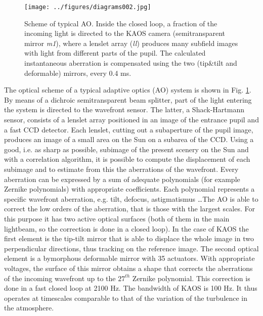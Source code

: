 \begin{figure}[t]
\begin{center}
\texttt{[image: ../figures/diagrams002.jpg]}
\caption{Scheme of typical AO. Inside the closed loop, a fraction of the incoming light is directed to the KAOS camera (semitransparent mirror \emph{m1}), where a lenslet array (\emph{ll}) produces many subfield images with light from different parts of the pupil. The calculated instantaneous aberration is compensated using the two (tip\&tilt  and deformable) mirrors, every 0.4 ms.}
\label{fig:kaos:optical}
\end{center}
\end{figure}

The optical scheme of a typical adaptive optics  (AO) system is shown in Fig. \ref{fig:kaos:optical}. By means of a dichroic semitransparent beam splitter, part of the light entering the system is directed to the wavefront sensor. The latter, a Shack-Hartmann sensor, consists of a lenslet array positioned in an image of the entrance pupil and  a fast CCD detector. Each lenslet, cutting out a subaperture of the pupil image, produces an image of a small area on the Sun on a subarea of the CCD. Using a good, i.e. as sharp as possible, subimage of the present scenery on the Sun and with a correlation algorithm, it is possible to compute the displacement of each subimage and to estimate from this the aberrations of the wavefront.
Every aberration can be expressed by a sum of adequate polynomials (for example Zernike polynomials) with appropriate coefficients. Each polynomial represents a specific wavefront aberration, e.g.  tilt, defocus, astigmatismus \dots The AO is able to correct the low orders of the aberration, that is those with the largest scales. For this purpose  it has two active optical surfaces (both of them in the main lightbeam, so the correction is done in a closed loop). In the case of KAOS the first element is the tip-tilt mirror that is able to displace the whole image in two perpendicular directions, thus tracking on the reference image. The second optical element is a bymorphous deformable mirror with 35 actuators. With appropriate voltages, the surface of this mirror obtains a shape that corrects the aberrations of the incoming wavefront up to the $27^{th}$ Zernike polynomial. This correction is done in a fast closed loop at 2100 Hz. The bandwidth of KAOS is 100 Hz. It thus operates at timescales comparable to that of the variation of the turbulence in the atmosphere.

